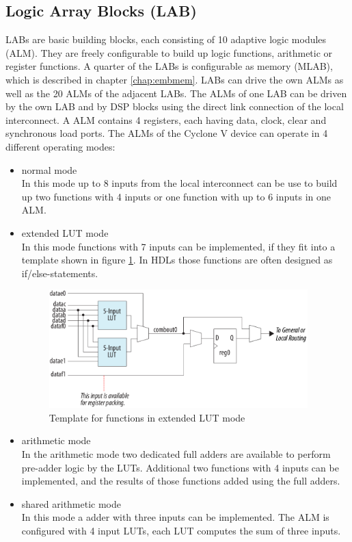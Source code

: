 \subsection{Logic Array Blocks (LAB)}
LABs are basic building blocks, each consisting of 10 adaptive logic modules (ALM). They are freely configurable to build up logic functions, arithmetic or register functions. A quarter of the LABs is configurable as memory (MLAB), which is described in chapter \ref{chap:embmem}. LABs can drive the own ALMs as well as the 20 ALMs of the adjacent LABs. The ALMs of one LAB can be driven by the own LAB and by DSP blocks using the direct link connection of the local interconnect. A ALM contains 4 registers, each having data, clock, clear and synchronous load ports. The ALMs of the Cyclone V device can operate in 4 different operating modes\cite[chapter 1]{AlteraFPGA15}:
\begin{itemize}
\item normal mode\\
In this mode up to 8 inputs from the local interconnect can be use to build up two functions with 4 inputs or one function with up to 6 inputs in one ALM. 
\item extended LUT mode\\
In this mode functions with 7 inputs can be implemented, if they fit into a template shown in figure \ref{fig:extendedlutfigure}. In HDLs those functions are often designed as if/else-statements.
\begin{figure}[htbp]
\begin{center}
\includegraphics[width=10cm,keepaspectratio=true]{bilder/png/extendedlutfigure}
\caption{Template for functions in extended LUT mode\cite[chapter 1]{AlteraFPGA15}}
\label{fig:extendedlutfigure}
\end{center}
\end{figure}
\item arithmetic mode\\
In the arithmetic mode two dedicated full adders are available to perform pre-adder logic by the LUTs. Additional two functions with 4 inputs can be implemented, and the results of those functions added using the full adders.
\item shared arithmetic mode\\
In this mode a adder with three inputs can be implemented. The ALM is configured with 4 input LUTs, each LUT computes the sum of three inputs.
\end{itemize}
